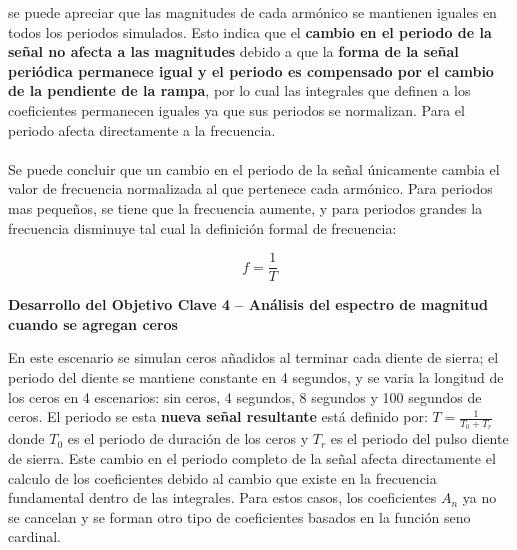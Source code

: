 \documentclass[7pt]{article}
\begin{document}
    se puede apreciar que las magnitudes de cada armónico se mantienen iguales en todos 
    los periodos simulados. Esto indica que el \textbf{cambio en el periodo de la señal no afecta a las 
    magnitudes} debido a que la \textbf{forma de la señal periódica permanece igual y el periodo es 
    compensado por el cambio de la pendiente de la rampa}, por lo cual las integrales que 
    definen a los coeficientes permanecen iguales ya que sus periodos se normalizan. Para el 
    periodo afecta directamente a la frecuencia.\\
    \\
    Se puede concluir que un cambio en el periodo de la señal únicamente cambia el valor de 
    frecuencia normalizada al que pertenece cada armónico. Para periodos mas pequeños, se 
    tiene que la frecuencia aumente, y para periodos grandes la frecuencia disminuye tal cual 
    la definición formal de frecuencia:
    
    \begin{equation}
        f=\frac{1}{T}
    \end{equation}

     \textbf{Desarrollo del Objetivo Clave 4 -- Análisis del espectro de magnitud cuando se agregan ceros}

     En este escenario se simulan ceros añadidos al terminar cada diente de sierra; el periodo del 
     diente se mantiene constante en 4 segundos, y se varia la longitud de los ceros en 4 escenarios: sin 
     ceros, 4 segundos, 8 segundos y 100 segundos de ceros. El periodo se esta \textbf{nueva señal resultante}
     está definido por: $T=\frac{1}{T_0+T_r}$ donde $T_0$ es el periodo de duración de los ceros y $T_r$ es el periodo 
     del pulso diente de sierra. Este cambio en el periodo completo de la señal afecta directamente el 
     calculo de los coeficientes debido al cambio que existe en la frecuencia fundamental dentro de las 
     integrales. Para estos casos, los coeficientes $A_n$ ya no se cancelan y se forman otro tipo de 
     coeficientes basados en la función seno cardinal.
\end{document}
